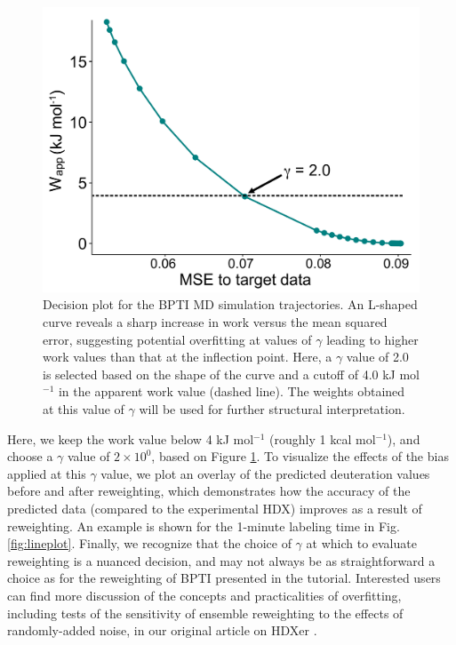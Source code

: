 \documentclass[9pt,tutorial]{livecoms}
\begin{document}
\begin{figure}
    \includegraphics[width=0.98\linewidth]{Fig4_BPTI_decision_plot_LFv2.pdf}
    \caption{Decision plot for the BPTI MD simulation trajectories. An L-shaped curve reveals a sharp increase in work versus the mean squared error, suggesting potential overfitting at values of $\gamma$ leading to higher work values than that at the inflection point. Here, a $\gamma$ value of 2.0 is selected based on the shape of the curve and a cutoff of 4.0 kJ mol$^{-1}$ in the apparent work value (dashed line). The weights obtained at this value of $\gamma$ will be used for further structural interpretation.}
    \label{fig:decision_plot}
\end{figure}

Here, we keep the work value below 4 kJ mol$^{-1}$ (roughly 1 kcal mol$^{-1}$), and choose a $\gamma$ value of $2\times10^0$, based on Figure \ref{fig:decision_plot}.
To visualize the effects of the bias applied at this $\gamma$ value, we plot an overlay of the predicted deuteration values before and after reweighting, which demonstrates how the accuracy of the predicted data (compared to the experimental HDX) improves as a result of reweighting.
An example is shown for the 1-minute labeling time in Fig. \ref{fig:lineplot}.
Finally, we recognize that the choice of $\gamma$ at which to evaluate reweighting is a nuanced decision, and may not always be as straightforward a choice as for the reweighting of BPTI presented in the tutorial.
Interested users can find more discussion of the concepts and practicalities of overfitting, including tests of the sensitivity of ensemble reweighting to the effects of randomly-added noise, in our original article on HDXer \cite{Bradshaw2020}.
\end{document}
